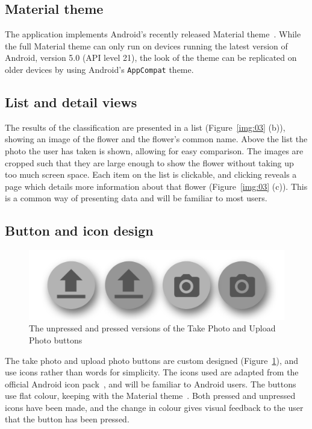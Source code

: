 \documentclass[11pt, a4paper]{report}
\begin{document}
\subsection{Material theme}

The application implements Android's recently released Material theme~\cite{AndroidDev:Material}. While the full Material theme can only run on devices running the latest version of Android, version 5.0 (API level 21), the look of the theme can be replicated on older devices by using Android's \verb|AppCompat| theme. 

\subsection{List and detail views}

The results of the classification are presented in a list (Figure~\ref{img:03} (b)), showing an image of the flower and the flower's common name. Above the list the photo the user has taken is shown, allowing for easy comparison. The images are cropped such that they are large enough to show the flower without taking up too much screen space. Each item on the list is clickable, and clicking reveals a page which details more information about that flower (Figure~\ref{img:03} (c)). This is a common way of presenting data and will be familiar to most users.


\subsection{Button and icon design}

\begin{figure}[hbt]
	\centering
  \includegraphics[totalheight=3cm]{img/13.png}
  \caption{The unpressed and pressed versions of the Take Photo and Upload Photo buttons}
  \label{img:13}
\end{figure}

The take photo and upload photo buttons are custom designed (Figure~\ref{img:13}), and use icons rather than words for simplicity. The icons used are adapted from the official Android icon pack~\cite{AndroidDev:Icons}, and will be familiar to Android users. The buttons use flat colour, keeping with the Material theme~\cite{AndroidDev:Material}. Both pressed and unpressed icons have been made, and the change in colour gives visual feedback to the user that the button has been pressed. 
\end{document}
